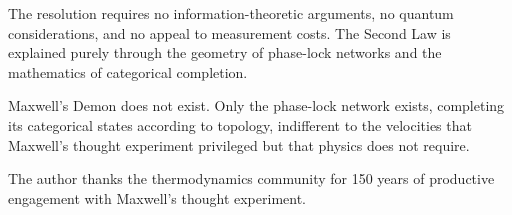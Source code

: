The resolution requires no information-theoretic arguments, no quantum considerations, and no appeal to measurement costs. The Second Law is explained purely through the geometry of phase-lock networks and the mathematics of categorical completion.

Maxwell's Demon does not exist. Only the phase-lock network exists, completing its categorical states according to topology, indifferent to the velocities that Maxwell's thought experiment privileged but that physics does not require.

\begin{acknowledgments}
The author thanks the thermodynamics community for 150 years of productive engagement with Maxwell's thought experiment.
\end{acknowledgments}

